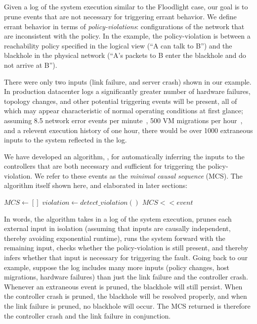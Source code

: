 \subsection{\SIMULATOR{}}
\label{sec:causal_analysis}

Given a log of the system execution similar to the Floodlight case,
our goal is to prune events that are not
necessary for triggering errant behavior. We define errant behavior in terms of {\em policy-violations}:
configurations of the network that are inconsistent
with the policy. In the example, the policy-violation is between a
reachability policy specified in the logical view (``A can talk to B'')
and the blackhole in the physical network (``A's packets to B enter the
blackhole and do not arrive at B'').

There were only two inputs (link failure, and server crash) shown in our example.
In production datacenter logs
a significantly greater number of hardware failures, topology changes,
and other potential triggering events will be present,
all of which may appear characteristic of normal operating
conditions at first glance; assuming 8.5 network error events per
minute~\cite{Greenberg:2009:VSF:1592568.1592576}, 500 VM migrations per
hour~\cite{Soundararajan:2010:CBS:1899928.1899941}, and a relevent execution
history of one hour, there would be over 1000 extraneous inputs to the system
reflected in the log.

We have developed an algorithm, \simulator{}, for automatically inferring the inputs to the
controllers  that are both necessary and sufficient for triggering the policy-violation. We
refer to these events as the {\em minimal causal sequence} (MCS). The
algorithm itself shown here, and elaborated in later sections:

\begin{algorithmic}
\State $MCS \gets []$
    \State $violation \gets detect\_violation()$
        \State $MCS << event$
    \EndIf
\EndFor
\end{algorithmic}

\noindent In words, the algorithm takes in a log of the system execution,
prunes each external input in isolation (assuming that inputs are causally
independent, thereby avoiding exponential runtime),
runs the system forward with the remaining input, checks whether the
policy-violation is still present, and thereby infers whether that input is
necessary for triggering the fault. Going back to our example, suppose the
log includes many more inputs (policy changes, host migrations, hardware
failures) than just the link failure and the controller crash. Whenever an
extraneous event is pruned, the blackhole will still persist. When
the controller crash is pruned, the blackhole will be resolved properly, and
when the link failure is pruned, no blackhole will occur. The MCS returned
is therefore the controller crash and the link failure in conjunction.

